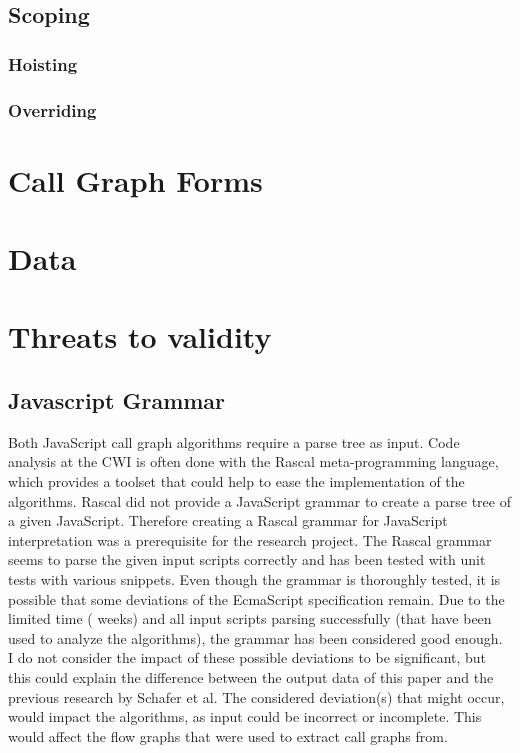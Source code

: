 \documentclass[journal,10pt]{IEEEtran}
\begin{document}
\subsection{Scoping}
\subsubsection{Hoisting}
\subsubsection{Overriding}


\section{Call Graph Forms}


\section{Data}

\section{Threats to validity}
\subsection{Javascript Grammar}
Both JavaScript call graph algorithms require a parse tree as input. Code analysis at the CWI is often done with the Rascal meta-programming language, which provides a toolset that could help to ease the implementation of the algorithms. Rascal did not provide a JavaScript grammar to create a parse tree of a given JavaScript. Therefore creating a Rascal grammar for JavaScript interpretation was a prerequisite for the research project. The Rascal grammar seems to parse the given input scripts correctly and has been tested with unit tests with various snippets. Even though the grammar is thoroughly tested, it is possible that some deviations of the EcmaScript specification remain.
Due to the limited time ( weeks) and all input scripts parsing successfully (that have been used to analyze the algorithms), the grammar has been considered good enough. I do not consider the impact of these possible deviations to be significant, but this could explain the difference between the output data of this paper and the previous research by Schafer et al. %
The considered deviation(s) that might occur, would impact the algorithms, as input could be incorrect or incomplete. This would affect the flow graphs that were used to extract call graphs from.
\end{document}
